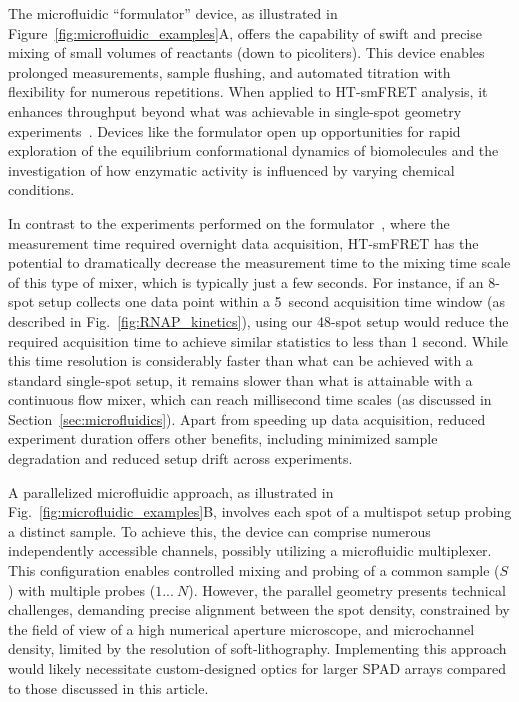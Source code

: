 The microfluidic \enquote{formulator} device, as illustrated in Figure~\ref{fig:microfluidic_examples}A, offers the capability of swift and precise mixing of small volumes of reactants (down to picoliters). 
This device enables prolonged measurements, sample flushing, and automated titration with flexibility for numerous repetitions. 
When applied to \ac{HT-smFRET} analysis, it enhances throughput beyond what was achievable in single-spot geometry experiments~\cite{kim_NM_2011}. 
Devices like the formulator open up opportunities for rapid exploration of the equilibrium conformational dynamics of biomolecules and the investigation of how enzymatic activity is influenced by varying chemical conditions.

In contrast to the experiments performed on the formulator~\cite{kim_NM_2011}, where the measurement time required overnight data acquisition, \ac{HT-smFRET} has the potential to dramatically decrease the measurement time to the mixing time scale of this type of mixer, which is typically just a few seconds. 
For instance, if an 8-spot setup collects one data point within a 5~second acquisition time window (as described in Fig.~\ref{fig:RNAP_kinetics}), using our 48-spot setup would reduce the required acquisition time to achieve similar statistics to less than 1 second. 
While this time resolution is considerably faster than what can be achieved with a standard single-spot setup, it remains slower than what is attainable with a continuous flow mixer, which can reach millisecond time scales (as discussed in Section~\ref{sec:microfluidics}). 
Apart from speeding up data acquisition, reduced experiment duration offers other benefits, including minimized sample degradation and reduced setup drift across experiments.

A parallelized microfluidic approach, as illustrated in Fig.~\ref{fig:microfluidic_examples}B, involves each spot of a multispot setup probing a distinct sample. 
To achieve this, the device can comprise numerous independently accessible channels, possibly utilizing a microfluidic multiplexer. 
This configuration enables controlled mixing and probing of a common sample ($S$) with multiple probes ($1...~N$). 
However, the parallel geometry presents technical challenges, demanding precise alignment between the spot density, constrained by the field of view of a high numerical aperture microscope, and microchannel density, limited by the resolution of soft-lithography. 
Implementing this approach would likely necessitate custom-designed optics for larger \ac{SPAD} arrays compared to those discussed in this article.

